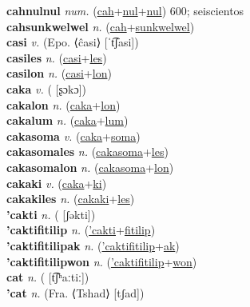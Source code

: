 \textbf{cahnulnul} \textit{num.} (\hyperref[cah]{cah}+\hyperref[nul]{nul}+\hyperref[nul]{nul})
600; seiscientos \label{cahnulnul} \\
\textbf{cahsunkwelwel} \textit{n.} (\hyperref[cah]{cah}+\hyperref[sunkwelwel]{sunkwelwel})
 \label{cahsunkwelwel} \\
\textbf{casi} \textit{v.} (Epo. ⟨ĉasi⟩ [ˈt͡ʃasi])
 \label{casi} \\
\textbf{casiles} \textit{n.} (\hyperref[casi]{casi}+\hyperref[les]{les})
 \label{casiles} \\
\textbf{casilon} \textit{n.} (\hyperref[casi]{casi}+\hyperref[lon]{lon})
 \label{casilon} \\
\textbf{caka} \textit{v.} ( [ʂɔkɔ])
 \label{caka} \\
\textbf{cakalon} \textit{n.} (\hyperref[caka]{caka}+\hyperref[lon]{lon})
 \label{cakalon} \\
\textbf{cakalum} \textit{n.} (\hyperref[caka]{caka}+\hyperref[lum]{lum})
 \label{cakalum} \\
\textbf{cakasoma} \textit{v.} (\hyperref[caka]{caka}+\hyperref[soma]{soma})
 \label{cakasoma} \\
\textbf{cakasomales} \textit{n.} (\hyperref[cakasoma]{cakasoma}+\hyperref[les]{les})
 \label{cakasomales} \\
\textbf{cakasomalon} \textit{n.} (\hyperref[cakasoma]{cakasoma}+\hyperref[lon]{lon})
 \label{cakasomalon} \\
\textbf{cakaki} \textit{v.} (\hyperref[caka]{caka}+\hyperref[ki]{ki})
 \label{cakaki} \\
\textbf{cakakiles} \textit{n.} (\hyperref[cakaki]{cakaki}+\hyperref[les]{les})
 \label{cakakiles} \\
\textbf{'cakti} \textit{n.} ( [ʃəkti])
 \label{'cakti} \\
\textbf{'caktifitilip} \textit{n.} (\hyperref['cakti]{'cakti}+\hyperref[fitilip]{fitilip})
 \label{'caktifitilip} \\
\textbf{'caktifitilipak} \textit{n.} (\hyperref['caktifitilip]{'caktifitilip}+\hyperref[ak]{ak})
 \label{'caktifitilipak} \\
\textbf{'caktifitilipwon} \textit{n.} (\hyperref['caktifitilip]{'caktifitilip}+\hyperref[won]{won})
 \label{'caktifitilipwon} \\
\textbf{cat} \textit{n.} ( [t͡ʃʰaːtiː])
 \label{cat} \\
\textbf{'cat} \textit{n.} (Fra. ⟨Tshad⟩ [tʃad])
 \label{'cat} \\
